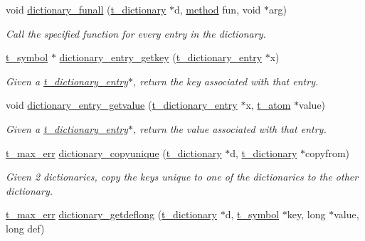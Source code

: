 \begin{DoxyCompactItemize}
void \hyperlink{group__dictionary_ga923b67932c8401f58dee86cfb3bb5110}{dictionary\_\-funall} (\hyperlink{structt__dictionary}{t\_\-dictionary} $\ast$d, \hyperlink{group__datatypes_gac26ba0a173b50597f5738132e059b42d}{method} fun, void $\ast$arg)
\begin{DoxyCompactList}\small\item\em Call the specified function for every entry in the dictionary. \item\end{DoxyCompactList}\item 
\hyperlink{structt__symbol}{t\_\-symbol} $\ast$ \hyperlink{group__dictionary_ga866aeb04d26740768790f64203f30b7c}{dictionary\_\-entry\_\-getkey} (\hyperlink{structt__dictionary__entry}{t\_\-dictionary\_\-entry} $\ast$x)
\begin{DoxyCompactList}\small\item\em Given a \hyperlink{structt__dictionary__entry}{t\_\-dictionary\_\-entry}$\ast$, return the key associated with that entry. \item\end{DoxyCompactList}\item 
void \hyperlink{group__dictionary_ga55877f4d0fef0a8d0badf9afc95bb7d0}{dictionary\_\-entry\_\-getvalue} (\hyperlink{structt__dictionary__entry}{t\_\-dictionary\_\-entry} $\ast$x, \hyperlink{structt__atom}{t\_\-atom} $\ast$value)
\begin{DoxyCompactList}\small\item\em Given a \hyperlink{structt__dictionary__entry}{t\_\-dictionary\_\-entry}$\ast$, return the value associated with that entry. \item\end{DoxyCompactList}\item 
\hyperlink{group__datatypes_ga73edaae82b318855cc09fac994918165}{t\_\-max\_\-err} \hyperlink{group__dictionary_gaef48a5cc22bc4c8b0fb23c7b7c3aa6a8}{dictionary\_\-copyunique} (\hyperlink{structt__dictionary}{t\_\-dictionary} $\ast$d, \hyperlink{structt__dictionary}{t\_\-dictionary} $\ast$copyfrom)
\begin{DoxyCompactList}\small\item\em Given 2 dictionaries, copy the keys unique to one of the dictionaries to the other dictionary. \item\end{DoxyCompactList}\item 
\hyperlink{group__datatypes_ga73edaae82b318855cc09fac994918165}{t\_\-max\_\-err} \hyperlink{group__dictionary_ga7beaedd2dbbc352539ccd104db7094b1}{dictionary\_\-getdeflong} (\hyperlink{structt__dictionary}{t\_\-dictionary} $\ast$d, \hyperlink{structt__symbol}{t\_\-symbol} $\ast$key, long $\ast$value, long def)

\end{DoxyCompactItemize}
